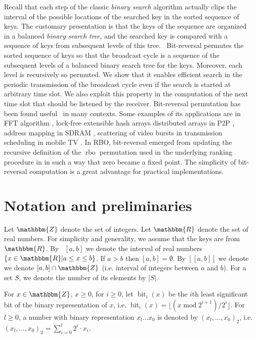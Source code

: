 \documentclass{article}
\newcommand{\tmem}[1]{{\em #1\/}}
\newcommand{\tmop}[1]{\ensuremath{\operatorname{#1}}}
\begin{document}
Recall that each step of the classic {\tmem{binary search}} algorithm actually
clips the interval of the possible locations of the searched key in the sorted
sequence of keys. The customary presentation is that the keys of the sequence
are organized in a balanced {\tmem{binary search tree}}, and the searched key
is compared with a sequence of keys from subsequent levels of this tree. \
Bit-reversal permutes the sorted sequence of keys so that the broadcast cycle
is a sequence of the subsequent levels of a balanced binary search tree for
the keys. Moreover, each level is recursively so permuted. We show that it
enables efficient search in the periodic transmission of the broadcast cycle
even if the search is started at arbitrary time slot. We also exploit this
property in the computation of the next time slot that should be listened by
the receiver. Bit-reversal permutation has been found useful \ in many
contexts. Some examples of its applications are in FFT algorithm
{\cite{CooleyTukey}} {\cite{CormenLR89}}, lock-free extensible hash arrays
{\cite{DBLP:journals/jacm/ShalevS06}} distributed arrays in P2P
{\cite{DBLP:conf/infocom/FukuchiSSH09}}, address mapping in SDRAM
{\cite{DBLP:conf/scopes/ShaoD05}}, scattering of video bursts in transmission
scheduling in mobile TV {\cite{DBLP:journals/ton/HefeedaH10}}. In RBO,
bit-reversal emerged from updating the recursive definition of the
$\tmop{rbo}$ permutation used in the underlying ranking procedure in
{\cite{DBLP:conf/adhoc-now/Kik08}} in such a way that zero became a fixed
point. The simplicity of bit-reversal computation is a great advantage for
practical implementations.

\section{Notation and preliminaries}

Let $\mathbbm{Z}$ denote the set of integers. Let $\mathbbm{R}$ denote the set
of real numbers. For simplicity and generality, we assume that the keys are
from $\mathbbm{R}$. By \ $[a, b]$ we denote the interval of real numbers $\{x
\in \mathbbm{R}| a \leq x \leq b\}$. If $a > b$ then $[a, b] = \emptyset$. By
$[[a, b]]$ we denote we denote $[a, b] \cap \mathbbm{Z}$ (i.e. interval of
integers between $a$ and $b$). For a set $S$, we denote the number
of its elements by $|S|$.

For $x \in \mathbbm{Z}$, $x \geq 0$, for $i \geq 0$, let $\tmop{bit}_i (x)$ be
the $i$th least significant bit of the binary representation of $x$, i.e.
$\tmop{bit}_i (x) = \lfloor (x \tmop{mod} 2^{i + 1}) / 2^i \rfloor$. For $l
\geq 0$, a number with binary representation $x_l \ldots x_0$ is denoted by
$(x_l, \ldots, x_0)_2$, i.e. $(x_l, \ldots, x_0)_2 = \sum_{i = 0}^l 2^i \cdot
x_i$.
\end{document}
